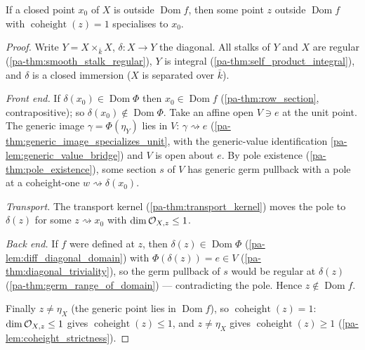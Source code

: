 \begin{theorem}
  \label{pa-thm:transport_assembly}
  \leanok

  If a closed point \(x_0\) of \(X\) is outside \(\operatorname{Dom} f\), then
  some point \(z\) outside \(\operatorname{Dom} f\) with
  \(\operatorname{coheight}(z) = 1\) specialises to \(x_0\).
\end{theorem}
\begin{proof}
  \leanok
  Write \(Y = X \times_{\bar k} X\), \(\delta : X \to Y\) the diagonal. All
  stalks of \(Y\) and \(X\) are regular (\ref{pa-thm:smooth_stalk_regular}), \(Y\)
  is integral (\ref{pa-thm:self_product_integral}), and \(\delta\) is a closed
  immersion (\(X\) is separated over \(\bar k\)).

  \emph{Front end.} If \(\delta(x_0) \in \operatorname{Dom}\Phi\) then \(x_0 \in
  \operatorname{Dom} f\) (\ref{pa-thm:row_section}, contrapositive); so
  \(\delta(x_0) \notin \operatorname{Dom}\Phi\). Take an affine open \(V \ni e\)
  at the unit point. The generic image \(\gamma = \Phi(\eta_Y)\) lies in \(V\):
  \(\gamma \rightsquigarrow e\) (\ref{pa-thm:generic_image_specializes_unit}, with
  the generic-value identification \ref{pa-lem:generic_value_bridge}) and \(V\) is
  open about \(e\). By pole existence (\ref{pa-thm:pole_existence}), some section
  \(s\) of \(V\) has generic germ pullback with a pole at a coheight-one
  \(w \rightsquigarrow \delta(x_0)\).

  \emph{Transport.} The transport kernel (\ref{pa-thm:transport_kernel}) moves the
  pole to \(\delta(z)\) for some \(z \rightsquigarrow x_0\) with
  \(\dim\mathcal{O}_{X,z} \le 1\).

  \emph{Back end.} If \(f\) were defined at \(z\), then \(\delta(z) \in
  \operatorname{Dom}\Phi\) (\ref{pa-lem:diff_diagonal_domain}) with \(\Phi(\delta(z))
  = e \in V\) (\ref{pa-thm:diagonal_triviality}), so the germ pullback of \(s\)
  would be regular at \(\delta(z)\) (\ref{pa-thm:germ_range_of_domain}) ---
  contradicting the pole. Hence \(z \notin \operatorname{Dom} f\).

  Finally \(z \neq \eta_X\) (the generic point lies in \(\operatorname{Dom} f\)),
  so \(\operatorname{coheight}(z) = 1\): \(\dim\mathcal{O}_{X,z} \le 1\) gives
  \(\operatorname{coheight}(z) \le 1\), and \(z \neq \eta_X\) gives
  \(\operatorname{coheight}(z) \ge 1\) (\ref{pa-lem:coheight_strictness}).
\end{proof}

